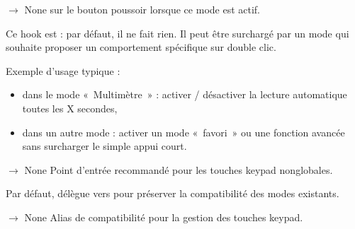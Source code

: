 \documentclass[letterpaper,10pt,french]{sphinxmanual}
\begin{document}
\begin{fulllineitems}
\begin{fulllineitems}
\label{\detokenize{api/core:core.mode_base.Mode.on_double_press}}
\pysigstartsignatures
\pysiglinewithargsret
{}
{}
{{ $\rightarrow$ None}}
\pysigstopsignatures
\sphinxAtStartPar
{} sur le bouton poussoir lorsque ce mode est actif.

\sphinxAtStartPar
Ce hook est  : par défaut, il ne fait rien.
Il peut être surchargé par un mode qui souhaite proposer un
comportement spécifique sur double clic.

\sphinxAtStartPar
Exemple d’usage typique :
\begin{itemize}
\item {} 
\sphinxAtStartPar
dans le mode « Multimètre » : activer / désactiver la
lecture automatique toutes les X secondes,

\item {} 
\sphinxAtStartPar
dans un autre mode : activer un mode « favori » ou une fonction
avancée sans surcharger le simple appui court.

\end{itemize}

\end{fulllineitems}


\begin{fulllineitems}
\label{\detokenize{api/core:core.mode_base.Mode.on_key_pressed}}
\pysigstartsignatures
\pysiglinewithargsret
{}
{}
{{ $\rightarrow$ None}}
\pysigstopsignatures
\sphinxAtStartPar
Point d’entrée recommandé pour les touches keypad non\sphinxhyphen{}globales.

\sphinxAtStartPar
Par défaut, délègue vers  pour préserver la
compatibilité des modes existants.

\end{fulllineitems}


\begin{fulllineitems}
\label{\detokenize{api/core:core.mode_base.Mode.on_keypad_key}}
\pysigstartsignatures
\pysiglinewithargsret
{}
{}
{{ $\rightarrow$ None}}
\pysigstopsignatures
\sphinxAtStartPar
Alias de compatibilité pour la gestion des touches keypad.


\end{fulllineitems}
\end{fulllineitems}
\end{document}
